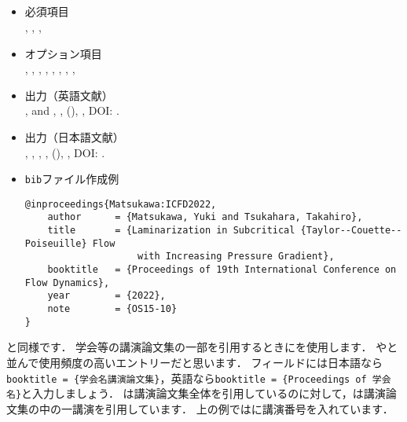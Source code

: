 \documentclass[a4paper,fleqn,uplatex,dvipdfmx]{jsarticle}
\begin{document}
\subsection{\ttinproceedings}
\label{ssec:inproceedings}
\begin{tcolorbox}[enhanced, title=\ttinproceedings, drop fuzzy shadow]
    \begin{itemize}
        \item 必須項目 \\
        \ttauthor, \tttitle, \ttbooktitle, \ttyear
        \item オプション項目 \\
        \tteditor, \ttpages, \ttorganization, \ttpublisher, \ttaddress, \ttmonth, \ttnote, \ttkey, \ttdoi
        \item 出力（英語文献） \\
            \colorbox[gray]{0.8}{\ttauthorf}, \colorbox[gray]{0.8}{\ttauthors} and \colorbox[gray]{0.8}{\ttauthort}, \colorbox[gray]{0.8}{\tttitle}, \colorbox[gray]{0.8}{\ttbooktitle} (\colorbox[gray]{0.8}{\ttyear}), \colorbox[gray]{0.8}{\ttnote}, DOI: \colorbox[gray]{0.8}{\ttdoi}.
        \item 出力（日本語文献） \\
            \colorbox[gray]{0.8}{\ttauthorf}, \colorbox[gray]{0.8}{\ttauthors}, \colorbox[gray]{0.8}{\ttauthort}, \colorbox[gray]{0.8}{\tttitle}, \colorbox[gray]{0.8}{\ttbooktitle} (\colorbox[gray]{0.8}{\ttyear}), \colorbox[gray]{0.8}{\ttnote}, DOI: \colorbox[gray]{0.8}{\ttdoi}.
        \item \verb|bib|ファイル作成例 \vspace{-3mm}
\begin{verbatim}
@inproceedings{Matsukawa:ICFD2022,
    author      = {Matsukawa, Yuki and Tsukahara, Takahiro},
    title       = {Laminarization in Subcritical {Taylor--Couette--Poiseuille} Flow 
                    with Increasing Pressure Gradient},
    booktitle   = {Proceedings of 19th International Conference on Flow Dynamics},
    year        = {2022},
    note        = {OS15-10}
}
\end{verbatim}
    \end{itemize}
\end{tcolorbox}

\ttconference と同様です．
学会等の講演論文集の一部を引用するときに\ttinproceedings を使用します．
\ttarticle や\ttinbook と並んで使用頻度の高いエントリーだと思います．
\ttbooktitle フィールドには日本語なら\texttt{booktitle = \{\colorbox[gray]{0.8}{学会名}講演論文集\}}，英語なら\texttt{booktitle = \{Proceedings of \colorbox[gray]{0.8}{学会名}\}}と入力しましょう．
\ttproceedings は講演論文集全体を引用しているのに対して，\ttinproceedings は講演論文集の中の一講演を引用しています．
上の例では\ttnote に講演番号を入れています．
\end{document}
